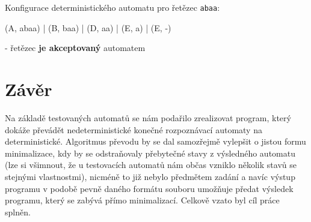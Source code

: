 \documentclass[11pt]{article}
\begin{document}
Konfigurace deterministického automatu pro řetězec \texttt{abaa}:

(A, abaa) | (B, baa) | (D, aa) | (E, a) | (E, -)

- řetězec \textbf{je akceptovaný} automatem

\newpage

\section{Závěr}

Na základě testovaných automatů se nám podařilo zrealizovat program, který dokáže převádět nedeterministické konečné rozpoznávací automaty na deterministické. Algoritmus převodu by se dal samozřejmě vylepšit o jistou formu minimalizace, kdy by se odstraňovaly přebytečné stavy z výsledného automatu (lze si všimnout, že u testovacích automatů nám občas vzniklo několik stavů se stejnými vlastnostmi), nicméně to již nebylo předmětem zadání a navíc výstup programu v podobě pevně daného formátu souboru umožňuje předat výsledek programu, který se zabývá přímo minimalizací. Celkově vzato byl cíl práce splněn.
\end{document}
